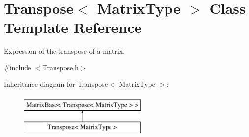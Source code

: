 \hypertarget{class_transpose}{\section{Transpose$<$ Matrix\-Type $>$ Class Template Reference}
\label{class_transpose}
}


Expression of the transpose of a matrix.  




{\ttfamily \#include $<$Transpose.\-h$>$}

Inheritance diagram for Transpose$<$ Matrix\-Type $>$\-:\begin{figure}[H]
\begin{center}
\leavevmode
\includegraphics[height=2.000000cm]{class_transpose}
\end{center}
\end{figure}

